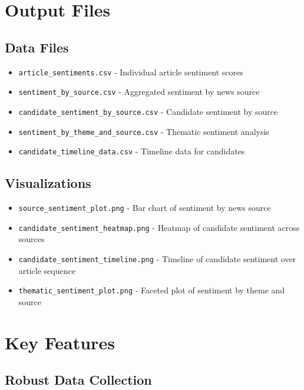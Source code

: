 \documentclass[11pt]{article}
\begin{document}
\section{Output Files}

\subsection{Data Files}

\begin{itemize}
    \item \texttt{article\_sentiments.csv} - Individual article sentiment scores
    \item \texttt{sentiment\_by\_source.csv} - Aggregated sentiment by news source
    \item \texttt{candidate\_sentiment\_by\_source.csv} - Candidate sentiment by source
    \item \texttt{sentiment\_by\_theme\_and\_source.csv} - Thematic sentiment analysis
    \item \texttt{candidate\_timeline\_data.csv} - Timeline data for candidates
\end{itemize}

\subsection{Visualizations}

\begin{itemize}
    \item \texttt{source\_sentiment\_plot.png} - Bar chart of sentiment by news source
    \item \texttt{candidate\_sentiment\_heatmap.png} - Heatmap of candidate sentiment across sources
    \item \texttt{candidate\_sentiment\_timeline.png} - Timeline of candidate sentiment over article sequence
    \item \texttt{thematic\_sentiment\_plot.png} - Faceted plot of sentiment by theme and source
\end{itemize}

\section{Key Features}

\subsection{Robust Data Collection}
\end{document}
